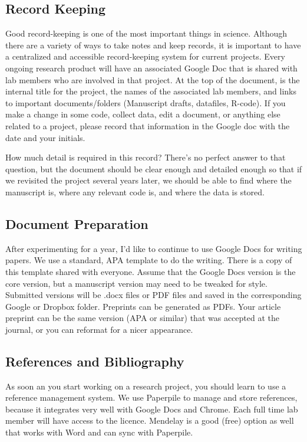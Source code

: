 \documentclass{article}
\begin{document}
\subsection{Record Keeping} Good record-keeping is one of the most important things in science. Although there are a variety of ways to take notes and keep records, it is important to have a centralized and accessible record-keeping system for current projects. Every ongoing research product will have an associated Google Doc that is shared with lab members who are involved in that project.  At the top of the document, is the internal title for the project, the names of the associated lab members, and links to important documents/folders (Manuscript drafts, datafiles, R-code). If you make a change in some code, collect data, edit a document, or anything else related to a project, please record that information in the Google doc with the date and your initials. 

How much detail is required in this record? There's no perfect answer to that question, but the document should be clear enough and detailed  enough so that if we revisited the project several years later, we should be able to find where the manuscript is, where any relevant code is, and where the data is stored. 

\subsection{Document Preparation} After experimenting for a year, I’d like to continue to use Google Docs for writing papers. We use a standard, APA template to do the writing. There is a copy of this template shared with everyone. Assume that the Google Docs version is the core version, but a manuscript version may need to be tweaked for style. Submitted versions will be .docx files or PDF files and saved in the corresponding Google or Dropbox folder. Preprints can be generated as PDFs. Your article preprint can be the same version (APA or similar) that was accepted at the journal, or you can reformat for a nicer appearance. 

\subsection{References and Bibliography} As soon an you start working on a research project, you should learn to use a reference management system. We use Paperpile to manage and store references, because it integrates very well with Google Docs and Chrome. Each full time lab member will have access to the licence. Mendelay is a good (free) option as well that works with Word and can sync with Paperpile.
\end{document}
